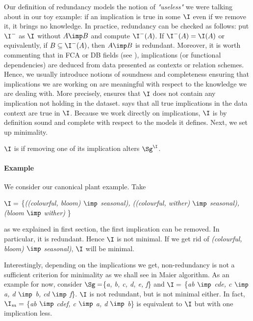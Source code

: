 \noindent Our definition of redundancy models the notion of \textit{"useless"} 
we were talking about in our toy example: if an implication is true in some 
$\I$ even if we remove it, it brings no knowledge. In practice, redundancy can 
be checked as follows: put $\I^{-}$ as
$\I$ without $A \imp B$ and compute $\I^{-}(A)$. If $\I^{-}(A) = \I(A)$ or 
equivalently, if $B \subseteq \I^{-}(A)$, then $A \imp B$ is redundant. 
Moreover, it is worth commenting that in FCA or DB fields (see 
\cite{ganter_formal_1999, maier_theory_1983}), implications (or 
functional dependencies) are deduced from data presented as contexts or relation schemes. Hence, 
we usually introduce notions of soundness and completeness ensuring that 
implications we are working on are meaningful with respect to the knowledge we 
are dealing with. More precisely,  ensures that $\I$ does not 
contain any implication not holding in the dataset. 
says that all true implications in the data context are true in $\I$. Because 
we work directly on implications, $\I$ is by definition sound and complete with 
respect to the models it defines. Next, we set up minimality.

\begin{definition}[Minimality] $\I$ is  if removing one of its 
	implication alters $\Sg^{\I}$.
	
\end{definition}

\paragraph{Example} We consider our canonical plant example. Take 

\begin{center}
	$\I = $  \{\textit{((colourful, bloom) $\imp$ seasonal), ((colourful, 
		wither) $\imp$ seasonal), (bloom $\imp$ wither)} \}
\end{center}

\noindent as we explained in first section, the first implication can be 
removed. In particular, it is redundant. Hence $\I$ is not minimal. If 
we get rid of \textit{(colourful, bloom) $\imp$ seasonal)}, $\I$ 
will be minimal.

\vspace{1.2em}

Interestingly, depending on the implications we get, non-redundancy is not a 
sufficient criterion for minimality as we shall see in Maier algorithm. As an 
example for now, consider $\Sg = $\{\textit{a, b, c, d, e, f}\} and $\I = $ 
\{\textit{ab $\imp$ cde, c $\imp$ a, d $\imp$ b, cd $\imp$ f}\}. $\I$ is not 
redundant, but is not minimal either. In fact, $\I_m = $ \{\textit{ab $\imp$ 
cdef, c $\imp$ a, d $\imp$ b}\} is equivalent to $\I$ but with one implication 
less. 

